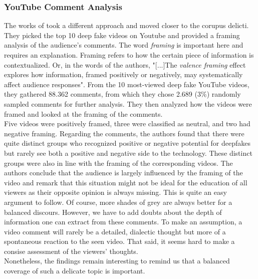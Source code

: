 \documentclass[
  a4paper,  %
  twoside,  %
  bibliography=totoc,
  headsepline,
  cleardoublepage=empty,
  parskip=half,
  draft=false
]{scrbook}
\begin{document}
\subsubsection*{YouTube Comment Analysis}
The works of \citeauthor{leeBelieveNotBelieve2021} took a different approach and moved closer to the corupus delicti. They picked the top 10 deep fake videos on Youtube and provided a framing analysis of the audience's comments. The word \textit{framing} is important here and requires an explanation. Framing refers to how the certain piece of information is contextualized. Or, in the words of the authors, "[...]The \textit{valence framing} effect explores how information, framed positively or negatively, may systematically affect audience responses". From the 10 most-viewed deep fake YouTube videos, they gathered 88.362 comments, from which they chose 2.689 (3\%) randomly sampled comments for further analysis. They then analyzed how the videos were framed and looked at the framing of the comments.\\
Five videos were positively framed, three were classified as neutral, and two had negative framing. Regarding the comments, the authors found that there were quite distinct groups who recognized positive or negative potential for deepfakes but rarely see both a positive and negative side to the technology. These distinct groups were also in line with the framing of the corresponding videos. The authors conclude that the audience is largely influenced by the framing of the video and remark that this situation might not be ideal for the education of all viewers as their opposite opinion is always missing. This is quite an easy argument to follow. Of course, more shades of grey are always better for a balanced discours. However, we have to add doubts about the depth of information one can extract from these comments. To make an assumption, a video comment will rarely be a detailed, dialectic thought but more of a spontaneous reaction to the seen video. That said, it seems hard to make a consise assessment of the viewers' thoughts. \\
Nonetheless, the findings remain interesting to remind us that a balanced coverage of such a delicate topic is important.
\end{document}
